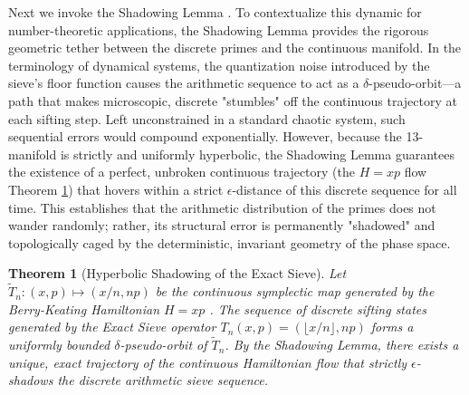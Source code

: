 \documentclass[sn-mathphys-num, pdflatex]{sn-jnl}
\newtheorem{theorem}{Theorem}[section]
\begin{document}
Next we invoke the Shadowing Lemma \cite{katok1995modern}. To contextualize this dynamic for number-theoretic applications, the Shadowing Lemma provides the rigorous geometric tether between the discrete primes and the continuous manifold. In the terminology of dynamical systems, the quantization noise introduced by the sieve's floor function causes the arithmetic sequence to act as a $\delta$-pseudo-orbit—a path that makes microscopic, discrete "stumbles" off the continuous trajectory at each sifting step. Left unconstrained in a standard chaotic system, such sequential errors would compound exponentially. However, because the 13-manifold is strictly and uniformly hyperbolic, the Shadowing Lemma guarantees the existence of a perfect, unbroken continuous trajectory (the $H=xp$ flow Theorem \ref{HS}) that hovers within a strict $\epsilon$-distance of this discrete sequence for all time. This establishes that the arithmetic distribution of the primes does not wander randomly; rather, its structural error is permanently "shadowed" and topologically caged by the deterministic, invariant geometry of the phase space.

\begin{theorem}[Hyperbolic Shadowing of the Exact Sieve]
\label{HS}
Let $\tilde{T}_n: (x,p) \mapsto (x/n, np)$ be the continuous symplectic map generated by the Berry-Keating Hamiltonian $H=xp$ \cite{berry1999riemann}. The sequence of discrete sifting states generated by the Exact Sieve operator $T_n(x,p) = (\lfloor x/n \rfloor, np)$ forms a uniformly bounded $\delta$-pseudo-orbit of $\tilde{T}_n$. By the Shadowing Lemma, there exists a unique, exact trajectory of the continuous Hamiltonian flow that strictly $\epsilon$-shadows the discrete arithmetic sieve sequence.
\end{theorem}
\end{document}
